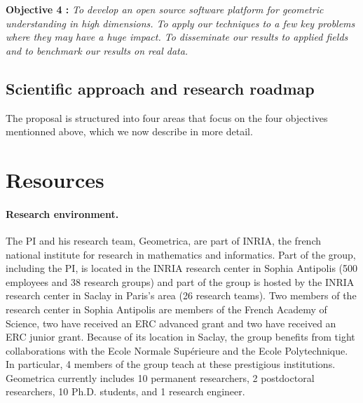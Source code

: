 {\bf Objective 4 :}   {\em To develop an open source {\em  software platform for geometric understanding in high dimensions}. %
To apply our techniques to a few key problems where they may have a huge impact. To disseminate our results to applied fields and to benchmark our results on real data.}

\subsection{Scientific approach and research roadmap} 


%


The proposal is structured into four areas that focus on the four objectives mentionned above, which we now describe in more detail. 









\section{Resources}

\paragraph{Research environment.}
The PI and his research team, Geometrica, are part of INRIA, the french national institute for research in mathematics and informatics. Part of the group, including the PI, is located in the INRIA research center in Sophia Antipolis  (500 employees and 38 research groups) and part of the group is hosted by the INRIA research center in Saclay in Paris's area (26 research teams). Two members of the research center in Sophia Antipolis are members of the French Academy of Science, two have received an ERC advanced grant and two have received an ERC junior grant. Because of its location in Saclay, the group benefits from tight collaborations with the Ecole Normale Sup\'erieure and the Ecole Polytechnique. In particular, 4 members of the group teach at these prestigious institutions. Geometrica currently includes 10 permanent researchers,  2 postdoctoral researchers, 10 Ph.D. students, and 1 research engineer. 

